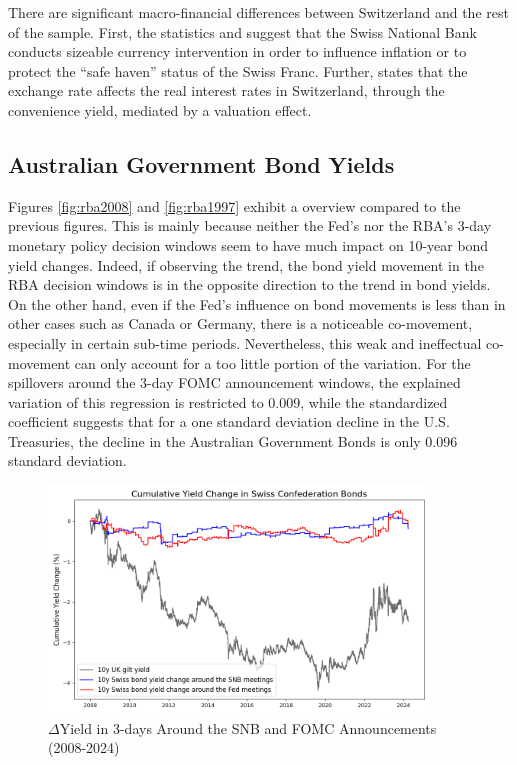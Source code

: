 There are significant macro-financial differences between Switzerland and the rest of the sample. First, the statistics and \citet{cwik2024fx} suggest that the Swiss National Bank conducts sizeable currency intervention in order to influence inflation or to protect the ``safe haven'' status of the Swiss Franc. Further, \citet{bacchetta2022understanding} states that the exchange rate affects the real interest rates in Switzerland, through the convenience yield, mediated by a valuation effect.


\subsection{Australian Government Bond Yields}

Figures \ref{fig:rba2008} and \ref{fig:rba1997} exhibit a overview compared to the previous figures. This is mainly because neither the Fed's nor the RBA's 3-day monetary policy decision windows seem to have much impact on 10-year bond yield changes. Indeed, if observing the trend, the bond yield movement in the RBA decision windows is in the opposite direction to the trend in bond yields. On the other hand, even if the Fed's influence on bond movements is less than in other cases such as Canada or Germany, there is a noticeable co-movement, especially in certain sub-time periods. Nevertheless, this weak and ineffectual co-movement can only account for a too little portion of the variation. For the spillovers around the 3-day FOMC announcement windows, the explained variation of this regression is restricted to 0.009, while the standardized coefficient suggests that for a one standard deviation decline in the U.S. Treasuries, the decline in the Australian Government Bonds is only 0.096 standard deviation. 

\begin{figure}[!htbp]
    \centering
     \caption{$\Delta$Yield in 3-days Around the SNB and FOMC Announcements (2008-2024)}   \includegraphics[width=0.9\textwidth]{figures/2008_swiss_bonds_figure1a.png}

    \label{fig:snb2008}
\end{figure}

